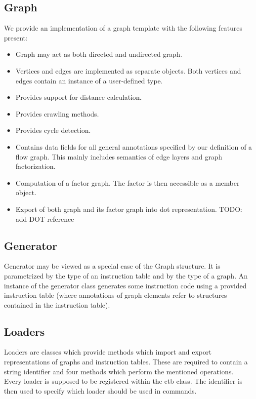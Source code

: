 \subsection*{Graph}

  We provide an implementation of a graph template with the following features present:

  \begin{itemize}
    \item Graph may act as both directed and undirected graph.
    \item Vertices and edges are implemented as separate objects. Both vertices and edges contain an instance of a user-defined type. 
    \item Provides support for distance calculation.
    \item Provides crawling methods.
    \item Provides cycle detection.
    \item Contains data fields for all general annotations specified by our definition of a flow graph. This mainly includes semantics of edge layers and graph factorization.
    \item Computation of a factor graph. The factor is then accessible as a member object.
    \item Export of both graph and its factor graph into dot representation. TODO: add DOT reference
  \end{itemize}

\subsection*{Generator}
  Generator may be viewed as a special case of the Graph structure. It is parametrized by the type of an instruction table and by the type of a graph. An instance of the generator class generates some instruction code using a provided instruction table (where annotations of graph elements refer to structures contained in the instruction table). 

\subsection*{Loaders}
  Loaders are classes which provide methods which import and export representations of graphs and instruction tables. These are required to contain a string identifier and four methods which perform the mentioned operations. Every loader is supposed to be registered within the ctb class. The identifier is then used to specify which loader should be used in commands.


